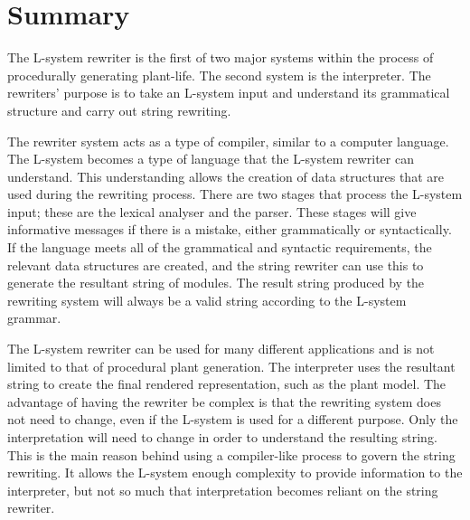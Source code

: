 \newpage
\section{Summary}

The L-system rewriter is the first of two major systems within the process of procedurally generating plant-life. The second system is the interpreter. The rewriters' purpose is to take an L-system input and understand its grammatical structure and carry out string rewriting.

The rewriter system acts as a type of compiler, similar to a computer language. The L-system becomes a type of language that the L-system rewriter can understand. This understanding allows the creation of data structures that are used during the rewriting process. There are two stages that process the L-system input; these are the lexical analyser and the parser. These stages will give informative messages if there is a mistake, either grammatically or syntactically. If the language meets all of the grammatical and syntactic requirements, the relevant data structures are created, and the string rewriter can use this to generate the resultant string of modules. The result string produced by the rewriting system will always be a valid string according to the L-system grammar. 

The L-system rewriter can be used for many different applications and is not limited to that of procedural plant generation. The interpreter uses the resultant string to create the final rendered representation, such as the plant model. The advantage of having the rewriter be complex is that the rewriting system does not need to change, even if the L-system is used for a different purpose.  Only the interpretation will need to change in order to understand the resulting string. This is the main reason behind using a compiler-like process to govern the string rewriting. It allows the L-system enough complexity to provide information to the interpreter, but not so much that interpretation becomes reliant on the string rewriter.